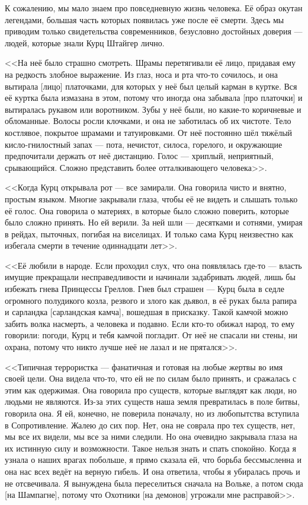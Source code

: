 К сожалению, мы мало знаем про повседневную жизнь человека.
Её образ окутан легендами, большая часть которых появилась уже после её смерти.
Здесь мы приводим только свидетельства современников, безусловно достойных доверия --- людей, которые знали Курц Штайгер лично.

<<На неё было страшно смотреть.
Шрамы перетягивали её лицо, придавая ему на редкость злобное выражение.
Из глаз, носа и рта что-то сочилось, и она вытирала [лицо] платочками, для которых у неё был целый карман в куртке.
Вся её куртка была измазана в этом, потому что иногда она забывала [про платочки] и вытиралась рукавом или воротником.
Зубы у неё были, но какие-то коричневые и обломанные.
Волосы росли клочками, и она не заботилась об их чистоте.
Тело костлявое, покрытое шрамами и татуировками.
От неё постоянно шёл тяжёлый кисло-гнилостный запах --- пота, нечистот, силоса, горелого, и окружающие предпочитали держать от неё дистанцию.
Голос --- хриплый, неприятный, срывающийся.
Сложно представить более отталкивающего человека>>.

<<Когда Курц открывала рот --- все замирали.
Она говорила чисто и внятно, простым языком.
Многие закрывали глаза, чтобы её не видеть и слышать только её голос.
Она говорила о материях, в которые было сложно поверить, которые было сложно принять.
Но ей верили.
За ней шли --- десятками и сотнями, умирая в рейдах, пыточных, погибая на виселицах.
И только сама Курц неизвестно как избегала смерти в течение одиннадцати лет>>.

<<Её любили в народе.
Если проходил слух, что она появлялась где-то --- власть имущие прекращали несправедливости и начинали задабривать людей, лишь бы избежать гнева Принцессы Греллов.
Гнев был страшен --- Курц была в седле огромного полудикого козла, резвого и злого как дьявол, в её руках была рапира и сарландка [сарландская камча], вошедшая в присказку.
Такой камчой можно забить волка насмерть, а человека и подавно.
Если кто-то обижал народ, то ему говорили: погоди, Курц и тебя камчой погладит.
От неё не спасали ни стены, ни охрана, потому что никто лучше неё не лазал и не прятался>>.

<<Типичная террористка --- фанатичная и готовая на любые жертвы во имя своей цели.
Она видела что-то, что ей не по силам было принять, и сражалась с этим как одержимая.
Она говорила про существ, которые выглядят как люди, но людьми не являются.
Из-за этих существ наша земля превратилась в поле битвы, говорила она.
Я ей, конечно, не поверила поначалу, но из любопытства вступила в Сопротивление.
Жалею до сих пор.
Нет, она не соврала про тех существ, нет, мы все их видели, мы все за ними следили.
Но она очевидно закрывала глаза на их истинную силу и возможности.
Такое нельзя знать и спать спокойно.
Когда я узнала о наших врагах побольше, я прямо сказала ей, что борьба бессмысленна и она нас всех ведёт на верную гибель.
И она ответила, чтобы я убиралась прочь и не отсвечивала.
Я вынуждена была переселиться сначала на Вольке, а потом сюда [на Шампагне], потому что Охотники [на демонов] угрожали мне расправой>>.


